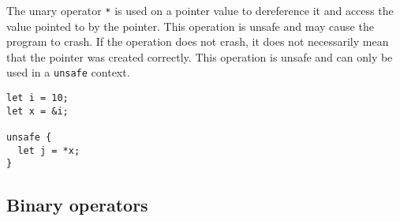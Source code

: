 The unary operator \texttt{*} is used on a pointer value to dereference it and
access the value pointed to by the pointer. This operation is unsafe and may
cause the program to crash. If the operation does not crash, it does not
necessarily mean that the pointer was created correctly. This operation is
unsafe and can only be used in a \texttt{unsafe} context.
\smallskip

\begin{lstlisting}[style=coloredverbatim]
let i = 10;
let x = &i;

unsafe {
  let j = *x;
}
\end{lstlisting}

\subsection {Binary operators}

